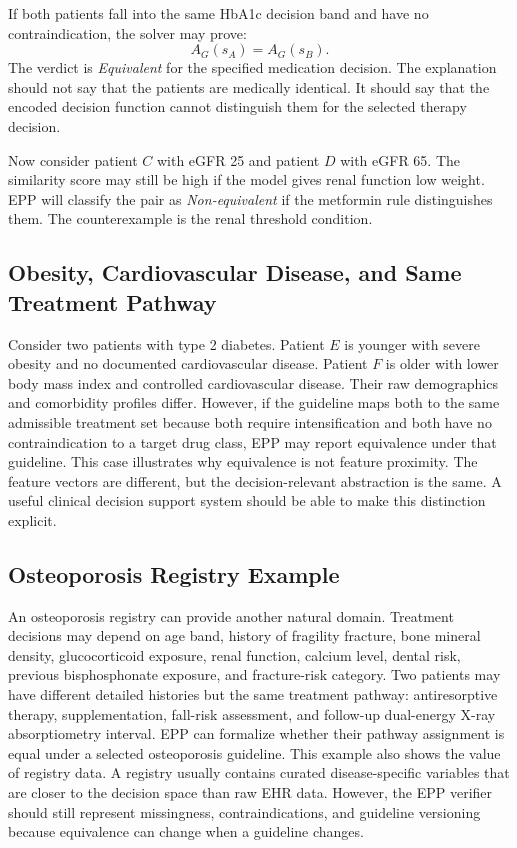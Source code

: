 \documentclass[english,5p,twocolumn,preprint]{elsarticle}
\begin{document}
If both patients fall into the same HbA1c decision band and have no contraindication, the solver may prove:
\begin{equation}
    A_G(s_A) = A_G(s_B).
\end{equation}
The verdict is \emph{Equivalent} for the specified medication decision. The explanation should not say that the patients are medically identical. It should say that the encoded decision function cannot distinguish them for the selected therapy decision.

Now consider patient $C$ with eGFR 25 and patient $D$ with eGFR 65. The similarity score may still be high if the model gives renal function low weight. EPP will classify the pair as \emph{Non-equivalent} if the metformin rule distinguishes them. The counterexample is the renal threshold condition.

\subsection{Obesity, Cardiovascular Disease, and Same Treatment Pathway}
Consider two patients with type 2 diabetes. Patient $E$ is younger with severe obesity and no documented cardiovascular disease. Patient $F$ is older with lower body mass index and controlled cardiovascular disease. Their raw demographics and comorbidity profiles differ. However, if the guideline maps both to the same admissible treatment set because both require intensification and both have no contraindication to a target drug class, EPP may report equivalence under that guideline. This case illustrates why equivalence is not feature proximity. The feature vectors are different, but the decision-relevant abstraction is the same. A useful clinical decision support system should be able to make this distinction explicit.

\subsection{Osteoporosis Registry Example}
An osteoporosis registry can provide another natural domain. Treatment decisions may depend on age band, history of fragility fracture, bone mineral density, glucocorticoid exposure, renal function, calcium level, dental risk, previous bisphosphonate exposure, and fracture-risk category. Two patients may have different detailed histories but the same treatment pathway: antiresorptive therapy, supplementation, fall-risk assessment, and follow-up dual-energy X-ray absorptiometry interval. EPP can formalize whether their pathway assignment is equal under a selected osteoporosis guideline. This example also shows the value of registry data. A registry usually contains curated disease-specific variables that are closer to the decision space than raw EHR data. However, the EPP verifier should still represent missingness, contraindications, and guideline versioning because equivalence can change when a guideline changes.
\end{document}
